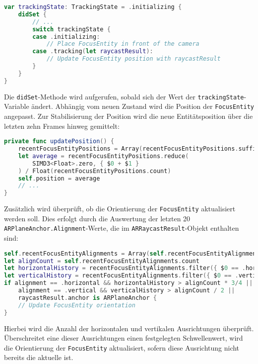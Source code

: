 \begin{lstlisting}[language=Swift]
var trackingState: TrackingState = .initializing {
    didSet {
        // ...
        switch trackingState {
        case .initializing:
            // Place FocusEntity in front of the camera
        case .tracking(let raycastResult):
            // Update FocusEntity position with raycastResult
        }
    }
}
\end{lstlisting}

Die \texttt{didSet}-Methode wird aufgerufen, sobald sich der Wert der \texttt{trackingState}-Variable ändert. Abhängig vom neuen Zustand wird die Position der \texttt{FocusEntity} angepasst. Zur Stabilisierung der Position wird die neue Entitätsposition über die letzten zehn Frames hinweg gemittelt:

\begin{lstlisting}[language=Swift]
private func updatePosition() {
    recentFocusEntityPositions = Array(recentFocusEntityPositions.suffix(10))
    let average = recentFocusEntityPositions.reduce(
        SIMD3<Float>.zero, { $0 + $1 }
    ) / Float(recentFocusEntityPositions.count)
    self.position = average
    // ...
}
\end{lstlisting}

Zusätzlich wird überprüft, ob die Orientierung der \texttt{FocusEntity} aktualisiert werden soll. Dies erfolgt durch die Auswertung der letzten 20 \texttt{ARPlaneAnchor.Alignment}-Werte, die im \texttt{ARRaycastResult}-Objekt enthalten sind:

\begin{lstlisting}[language=Swift]
self.recentFocusEntityAlignments = Array(self.recentFocusEntityAlignments.suffix(20))
let alignCount = self.recentFocusEntityAlignments.count
let horizontalHistory = recentFocusEntityAlignments.filter({ $0 == .horizontal }).count
let verticalHistory = recentFocusEntityAlignments.filter({ $0 == .vertical }).count
if alignment == .horizontal && horizontalHistory > alignCount * 3/4 ||
    alignment == .vertical && verticalHistory > alignCount / 2 ||
    raycastResult.anchor is ARPlaneAnchor {
    // Update FocusEntity orientation
}
\end{lstlisting}

Hierbei wird die Anzahl der horizontalen und vertikalen Ausrichtungen überprüft. Überschreitet eine dieser Ausrichtungen einen festgelegten Schwellenwert, wird die Orientierung der \texttt{FocusEntity} aktualisiert, sofern diese Ausrichtung nicht bereits die aktuelle ist.

